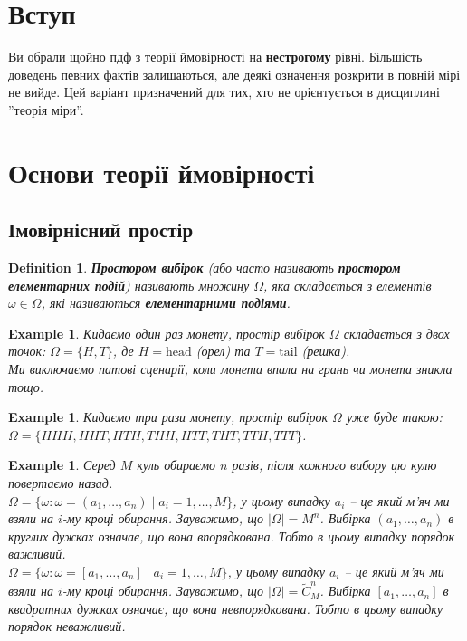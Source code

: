 \documentclass[a4paper, 10pt]{article}
\theoremstyle{theoremdd}
\newtheorem{definition}[theorem]{Definition}
\newtheorem{example}[theorem]{Example}
\begin{document}

\tableofcontents
\newpage
\section*{Вступ}
Ви обрали щойно пдф з теорії ймовірності на \textbf{нестрогому} рівні. Більшість доведень певних фактів залишаються, але деякі означення розкрити в повній мірі не вийде. Цей варіант призначений для тих, хто не орієнтується в дисциплині ''теорія міри''.
\newpage
    	
\section{Основи теорії ймовірності}
\subsection{Імовірнісний простір}
\begin{definition}
\textbf{Простором вибірок} (або часто називають \textbf{простором елементарних подій}) називають множину $\Omega$, яка складається з елементів $\omega \in \Omega$, які називаються \textbf{елементарними подіями}.
\end{definition}

\begin{example}
Кидаємо один раз монету, простір вибірок $\Omega$ складається з двох точок: $\Omega = \{H, T\}$, де $H = \text{head}$ (орел) та $T = \text{tail}$ (решка). \\
Ми виключаємо патові сценарії, коли монета впала на грань чи монета зникла тощо.
\end{example}

\begin{example}
Кидаємо три рази монету, простір вибірок $\Omega$ уже буде такою:\\
$\Omega = \{ HHH, HHT, HTH, THH, HTT, THT, TTH, TTT \}$.
\end{example}

\begin{example}
Серед $M$ куль обираємо $n$ разів, після кожного вибору цю кулю повертаємо назад.\\
$\Omega = \{\omega : \omega = (a_1,\dots,a_n) \mid a_i = 1,\dots,M\}$, у цьому випадку $a_i$ -- це який м'яч ми взяли на $i$-му кроці обирання. Зауважимо, що $|\Omega| = M^n$. Вибірка $(a_1,\dots,a_n)$ в круглих дужках означає, що вона впорядкована. Тобто в цьому випадку порядок важливий.\\
$\Omega = \{\omega : \omega = [a_1,\dots,a_n] \mid a_i = 1,\dots,M\}$, у цьому випадку $a_i$ -- це який м'яч ми взяли на $i$-му кроці обирання. Зауважимо, що $|\Omega| = \widetilde{C}_M^n$. Вибірка $[a_1,\dots,a_n]$ в квадратних дужках означає, що вона невпорядкована. Тобто в цьому випадку порядок неважливий.
\end{example}
\end{document}
